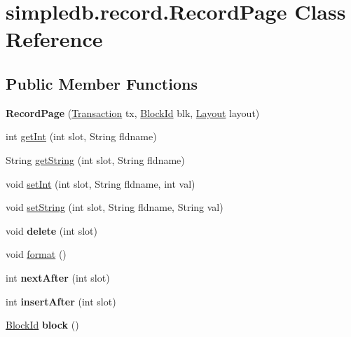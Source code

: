 \hypertarget{classsimpledb_1_1record_1_1RecordPage}{}\section{simpledb.\+record.\+Record\+Page Class Reference}
\label{classsimpledb_1_1record_1_1RecordPage}
\subsection*{Public Member Functions}
\begin{DoxyCompactItemize}
\item 
\mbox{\label{classsimpledb_1_1record_1_1RecordPage_a313d883654d4a7b94d32e20d3a0f2239}} 
{\bfseries Record\+Page} (\hyperlink{classsimpledb_1_1tx_1_1Transaction}{Transaction} tx, \hyperlink{classsimpledb_1_1file_1_1BlockId}{Block\+Id} blk, \hyperlink{classsimpledb_1_1record_1_1Layout}{Layout} layout)
\item 
int \hyperlink{classsimpledb_1_1record_1_1RecordPage_a4ff1955420f4018a6809e88b6008654a}{get\+Int} (int slot, String fldname)
\item 
String \hyperlink{classsimpledb_1_1record_1_1RecordPage_aa304049fd993d08097e8e0e6e5877810}{get\+String} (int slot, String fldname)
\item 
void \hyperlink{classsimpledb_1_1record_1_1RecordPage_ade07f28ec8ebd2f9b5635fdaf2aa1b93}{set\+Int} (int slot, String fldname, int val)
\item 
void \hyperlink{classsimpledb_1_1record_1_1RecordPage_ad464ee57a318a8a8044fb2258d49058f}{set\+String} (int slot, String fldname, String val)
\item 
\mbox{\label{classsimpledb_1_1record_1_1RecordPage_aad65baf26da26bafee81915ddcfcb44f}} 
void {\bfseries delete} (int slot)
\item 
void \hyperlink{classsimpledb_1_1record_1_1RecordPage_a892fe53c31f295c503179004c4a9037d}{format} ()
\item 
\mbox{\label{classsimpledb_1_1record_1_1RecordPage_a537ac9ff4b5bf231042b950efe8e1b2d}} 
int {\bfseries next\+After} (int slot)
\item 
\mbox{\label{classsimpledb_1_1record_1_1RecordPage_ad3f91a8ee9fdda828ee5bc8d2912b1e5}} 
int {\bfseries insert\+After} (int slot)
\item 
\mbox{\label{classsimpledb_1_1record_1_1RecordPage_a194a0b13d477a7aa9d94cd124d22e798}} 
\hyperlink{classsimpledb_1_1file_1_1BlockId}{Block\+Id} {\bfseries block} ()
\end{DoxyCompactItemize}
